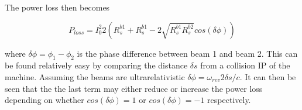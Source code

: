 The power loss then becomes

\begin{equation}
P_{loss} = I_{0}^{2} 2 \left( R_{s}^{b1} +  R_{s}^{b1} - 2\sqrt{R^{b1}_{s}R^{b2}_{s}} cos \left( \delta \phi \right) \right)
\end{equation}

where $\delta \phi = \phi_{1} - \phi_{2}$ is the phase difference between beam 1 and beam 2. This can be found relatively easy by comparing the distance $\delta s$ from a collision IP of the machine. Assuming the beams are ultrarelativistic $\delta \phi = \omega_{rev} 2  \delta s /c$. It can then be seen that the the last term may either reduce or increase the power loss depending on whether $cos\left( \delta \phi \right) = 1$ or $cos\left( \delta \phi \right) = -1$ respectively.

